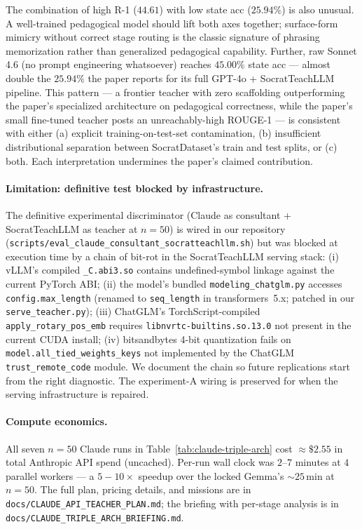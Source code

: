 \documentclass[11pt]{article}
\begin{document}
The combination of high R-1 ($44.61$) with low state acc ($25.94\%$) is also unusual. A well-trained pedagogical model should lift both axes together; surface-form mimicry without correct stage routing is the classic signature of phrasing memorization rather than generalized pedagogical capability. Further, raw Sonnet 4.6 (no prompt engineering whatsoever) reaches $45.00\%$ state acc --- almost double the $25.94\%$ the paper reports for its full GPT-4o + SocratTeachLLM pipeline. This pattern --- a frontier teacher with zero scaffolding outperforming the paper's specialized architecture on pedagogical correctness, while the paper's small fine-tuned teacher posts an unreachably-high ROUGE-1 --- is consistent with either (a) explicit training-on-test-set contamination, (b) insufficient distributional separation between SocratDataset's train and test splits, or (c) both. Each interpretation undermines the paper's claimed contribution.

\paragraph{Limitation: definitive test blocked by infrastructure.} The definitive experimental discriminator (Claude as consultant + SocratTeachLLM as teacher at $n{=}50$) is wired in our repository (\texttt{scripts/eval\_claude\_consultant\_socratteachllm.sh}) but was blocked at execution time by a chain of bit-rot in the SocratTeachLLM serving stack: (i) vLLM's compiled \texttt{\_C.abi3.so} contains undefined-symbol linkage against the current PyTorch ABI; (ii) the model's bundled \texttt{modeling\_chatglm.py} accesses \texttt{config.max\_length} (renamed to \texttt{seq\_length} in transformers~5.x; patched in our \texttt{serve\_teacher.py}); (iii) ChatGLM's TorchScript-compiled \texttt{apply\_rotary\_pos\_emb} requires \texttt{libnvrtc-builtins.so.13.0} not present in the current CUDA install; (iv) bitsandbytes 4-bit quantization fails on \texttt{model.all\_tied\_weights\_keys} not implemented by the ChatGLM \texttt{trust\_remote\_code} module. We document the chain so future replications start from the right diagnostic. The experiment-A wiring is preserved for when the serving infrastructure is repaired.

\paragraph{Compute economics.} All seven $n{=}50$ Claude runs in Table~\ref{tab:claude-triple-arch} cost $\approx\$2.55$ in total Anthropic API spend (uncached). Per-run wall clock was $2$--$7$ minutes at $4$ parallel workers --- a $5{-}10\times$ speedup over the locked Gemma's $\sim 25$\,min at $n{=}50$. The full plan, pricing details, and missions are in \texttt{docs/CLAUDE\_API\_TEACHER\_PLAN.md}; the briefing with per-stage analysis is in \texttt{docs/CLAUDE\_TRIPLE\_ARCH\_BRIEFING.md}.
\end{document}
